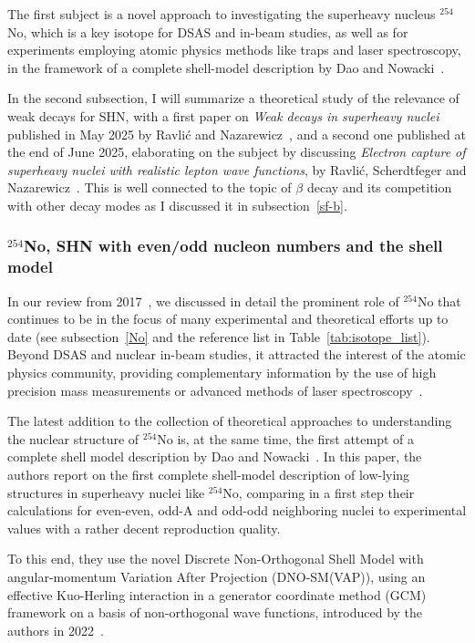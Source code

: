  The first subject is a novel approach to investigating the superheavy nucleus $^{254}$No, which is a key isotope for DSAS and in-beam studies, as well as for experiments employing atomic physics methods like traps and laser spectroscopy, in the framework of a complete shell-model description by Dao and Nowacki~\cite{Dao2025}.  
 
 In the second subsection, I will summarize a theoretical study of the relevance of weak decays for SHN, with a first paper on {\it Weak decays in superheavy nuclei} published in May 2025 by Ravli\'{c} and Nazarewicz~\cite{Ravlic2025}, and a second one published at the end of June 2025, elaborating on the subject by discussing {\it Electron capture of superheavy nuclei with realistic lepton wave functions}, by  Ravli\'{c}, Scherdtfeger and Nazarewicz~\cite{Ravlic2025a}. 
 This is well connected to the topic of $\beta$ decay and its competition with other decay modes as I discussed it in subsection~\ref{sf-b}. 

\subsubsection{$^{254}$No, SHN with even/odd nucleon numbers and the shell model}\label{254No_SM}

In our review from 2017~\cite{Ackermann2017}, we discussed in detail the prominent role of $^{254}$No that continues to be in the focus of many experimental and theoretical efforts up to date (see subsection~\ref{No} and the reference list in Table~\ref{tab:isotope_list}).
Beyond DSAS and nuclear in-beam studies, it attracted the interest of the atomic physics community, providing complementary information by the use of high precision mass measurements or advanced methods of laser spectroscopy~\cite{Block2010,Minaya-Ramirez2012,Raeder2018,Block2021}. 

The latest addition to the collection of theoretical approaches to understanding the nuclear structure of $^{254}$No is, at the same time, the first attempt of a complete shell model description by Dao and Nowacki~\cite{Dao2025}.
In this paper, the authors report on the first complete shell-model description of low-lying structures in superheavy nuclei like $^{254}$No, comparing in a first step their calculations for even-even, odd-A and odd-odd neighboring nuclei to experimental values with a rather decent reproduction quality. 

To this end, they use the novel Discrete Non-Orthogonal Shell Model with angular-momentum Variation After Projection (DNO-SM(VAP)), using an effective Kuo-Herling interaction in a generator coordinate method (GCM) framework on a basis of non-orthogonal wave functions, introduced by the authors in 2022~\cite{Dao2022}.

